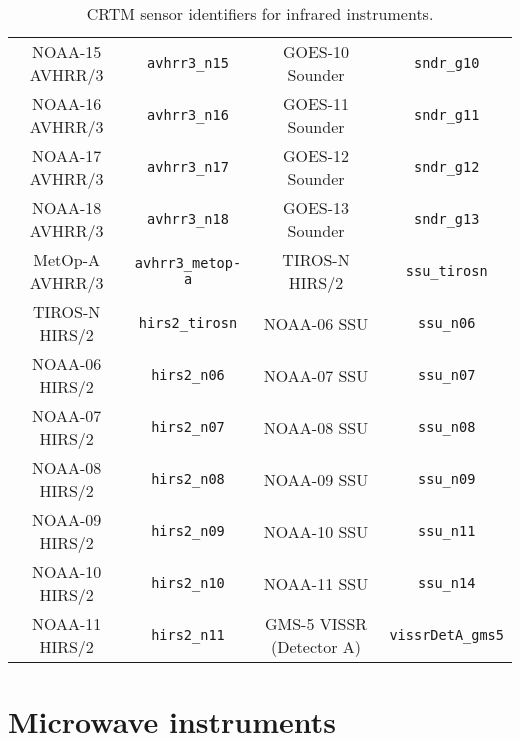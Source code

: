 \begin{table}[htp]
\begin{tabular}{|c|c||c|c|}
NOAA-15 AVHRR/3 & \texttt{avhrr3\_n15}             & GOES-10 Sounder & \texttt{sndr\_g10}                      \\
NOAA-16 AVHRR/3 & \texttt{avhrr3\_n16}             & GOES-11 Sounder & \texttt{sndr\_g11}                      \\
NOAA-17 AVHRR/3 & \texttt{avhrr3\_n17}             & GOES-12 Sounder & \texttt{sndr\_g12}                      \\
NOAA-18 AVHRR/3 & \texttt{avhrr3\_n18}             & GOES-13 Sounder & \texttt{sndr\_g13}                      \\
MetOp-A AVHRR/3 & \texttt{avhrr3\_metop-a}         & TIROS-N HIRS/2  & \texttt{ssu\_tirosn}                    \\
TIROS-N HIRS/2 & \texttt{hirs2\_tirosn}            & NOAA-06 SSU & \texttt{ssu\_n06}                           \\
NOAA-06 HIRS/2 & \texttt{hirs2\_n06}               & NOAA-07 SSU & \texttt{ssu\_n07}                           \\
NOAA-07 HIRS/2 & \texttt{hirs2\_n07}               & NOAA-08 SSU & \texttt{ssu\_n08}                           \\
NOAA-08 HIRS/2 & \texttt{hirs2\_n08}               & NOAA-09 SSU & \texttt{ssu\_n09}                           \\
NOAA-09 HIRS/2 & \texttt{hirs2\_n09}               & NOAA-10 SSU & \texttt{ssu\_n11}                           \\
NOAA-10 HIRS/2 & \texttt{hirs2\_n10}               & NOAA-11 SSU & \texttt{ssu\_n14}                           \\
NOAA-11 HIRS/2 & \texttt{hirs2\_n11}               & GMS-5 VISSR (Detector A) & \texttt{vissrDetA\_gms5}       \\
    \hline
  \end{tabular}
  \caption{CRTM sensor identifiers for infrared instruments.}
  \label{tab:ir_sensor_id}
\end{table}


\section{Microwave instruments}

